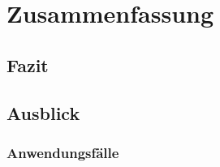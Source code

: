 \documentclass[\main/find-a-part.tex]{subfiles}
\begin{document}
\chapter{Zusammenfassung}


\section{Fazit}

\section{Ausblick}


\subsection{Anwendungsfälle}
\end{document}

